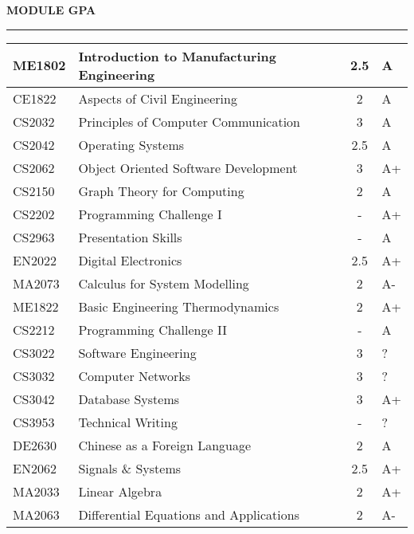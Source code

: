\documentclass{article}
\newenvironment{rSection}[1]{
    \sectionskip
    \MakeUppercase{\bf #1} 
    \sectionlineskip
    \hrule
    \begin{list}{}{ 
        \setlength{\leftmargin}{1.5em} 
    }
    \item[]
}{
    \end{list}
}
\def\sectionskip{\medskip}
\def\sectionlineskip{\medskip}
\begin{document}
\begin{rSection}{Module GPA}
\begin{tabularx}{\linewidth}{|l|X|c|l|}
    ME1802  &   Introduction to Manufacturing Engineering   & 2.5   &    A  \\
    \hline
    CE1822  &   Aspects of Civil Engineering	            & 2     &    A  \\
    CS2032  &   Principles of Computer Communication	    & 3     &    A  \\
    CS2042  &   Operating Systems	                        & 2.5   &    A  \\
    CS2062  &   Object Oriented Software Development	    & 3     &    A+ \\
    CS2150  &   Graph Theory for Computing	                & 2     &    A  \\
    CS2202  &   Programming Challenge I	                    & -     &    A+ \\
    CS2963  &   Presentation Skills	                        & -     &    A  \\
    EN2022  &   Digital Electronics	                        & 2.5   &    A+ \\
    MA2073  &   Calculus for System Modelling	            & 2     &    A- \\
    ME1822  &   Basic Engineering Thermodynamics	        & 2     &    A+ \\
    \hline
    CS2212  &   Programming Challenge II	                & -     &    A  \\
    CS3022  &   Software Engineering	                    & 3     &    ?  \\
    CS3032  &   Computer Networks	                        & 3     &    ?  \\
    CS3042  &   Database Systems	                        & 3     &    A+ \\
    CS3953  &   Technical Writing	                        & -     &    ?  \\
    DE2630  &   Chinese as a Foreign Language	            & 2     &    A  \\
    EN2062  &   Signals \& Systems	                        & 2.5   &    A+ \\
    MA2033  &   Linear Algebra	                            & 2     &    A+ \\
    MA2063  &   Differential Equations and Applications	    & 2     &    A- \\
    \hline
\end{tabularx}
\end{rSection}
\end{document}
